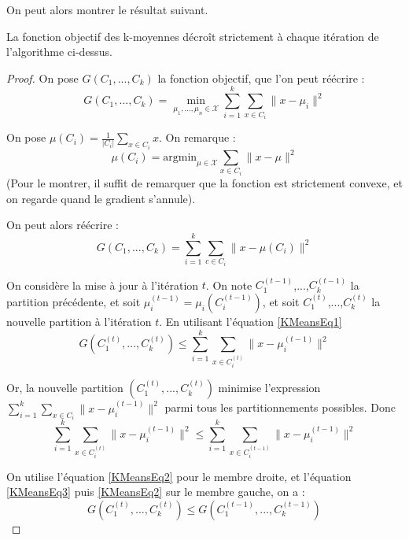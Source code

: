 On peut alors montrer le résultat suivant.

\begin{lemma}
La fonction objectif des k-moyennes décroît strictement à chaque itération de l'algorithme ci-dessus.
\end{lemma}

\begin{proof}
On pose $G(C_1,...,C_k)$ la fonction objectif, que l'on peut réécrire :
\begin{equation}\label{KMeansEq1}
G(C_1,...,C_k) = \min_{\mu_1,...,\mu_n \in \mathcal{X}} \sum_{i=1}^k \sum_{x\in C_i} \|x-\mu_i\|^2 
\end{equation}

On pose $\mu(C_i) = \frac{1}{|C_i|} \sum_{x\in C_i} x$. On remarque :
\begin{equation}\label{KMeansEq2}
\mu(C_i) = \text{argmin}_{\mu\in \mathcal{X}} \sum_{x\in C_i} \|x-\mu\|^2
\end{equation}
(Pour le montrer, il suffit de remarquer que la fonction est strictement convexe, et on regarde quand le gradient s'annule).

On peut alors réécrire :
$$
G(C_1,...,C_k) = \sum_{i=1}^k \sum_{c\in C_i} \|x-\mu(C_i)\|^2
$$

On considère la mise à jour à l'itération $t$. On note $C_1^{(t-1)}$,...,$C_k^{(t-1)}$ la partition précédente, et soit $\mu_i^{(t-1)} = \mu_{i}(C_i^{(t-1)})$, et soit $C_1^{(t)}$,...,$C_k^{(t)}$ la nouvelle partition à l'itération $t$. En utilisant l'équation \ref{KMeansEq1}
\begin{equation}\label{KMeansEq3}
G(C_1^{(t)},...,C_k^{(t)}) \leq \sum_{i=1}^k \sum_{x\in C_i^{(t)}} \|x-\mu_i^{(t-1)}\|^2
\end{equation}

Or, la nouvelle partition $(C_1^{(t)},...,C_k^{(t)})$ minimise l'expression $\sum_{i=1}^k \sum_{x\in C_i} \|x-\mu_i^{(t-1)}\|^2$ parmi tous les partitionnements possibles. Donc 
$$
\sum_{i=1}^k \sum_{x\in C_i^{(t)}} \|x-\mu_i^{(t-1)}\|^2 \leq \sum_{i=1}^k \sum_{x\in C_i^{(t-1)}} \|x-\mu_i^{(t-1)}\|^2
$$

On utilise l'équation \ref{KMeansEq2} pour le membre droite, et l'équation \ref{KMeansEq3} puis \ref{KMeansEq2} sur le membre gauche, on a :
$$
G(C_1^{(t)},...,C_k^{(t)}) \leq  G(C_1^{(t-1)},...,C_k^{(t-1)})
$$ 
\end{proof}
